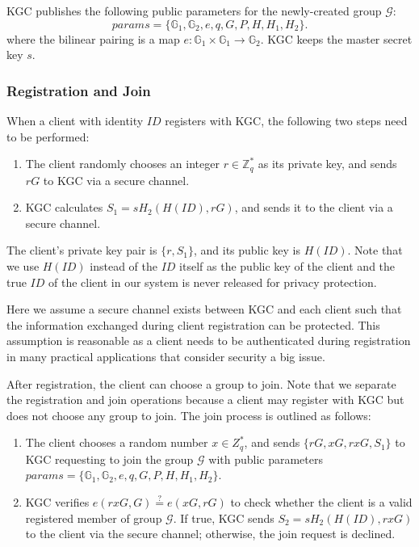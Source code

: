 \documentclass[letterpaper,12pt]{article}
\begin{document}
KGC publishes the following public parameters for the newly-created group $\mathcal{G}$:
\begin{equation}
params=\{\mathbb{G}_1, \mathbb{G}_2, e, q, G, P, H, H_1, H_2\}.
\end{equation}
where the bilinear pairing is a map $e: \mathbb{G}_1\times \mathbb{G}_1\longrightarrow \mathbb{G}_2$.
KGC keeps the master secret key $s$.

\subsubsection{Registration and Join}\label{sec:sec:Registration_Join}
When a client with identity $ID$ registers with KGC, the following two steps need to be performed:
\begin{enumerate}
 \item The client randomly chooses an integer $r \in \mathbb{Z}_q^{\ast}$ as its private key, and sends $rG$ to KGC via a secure channel.

 \item KGC calculates $S_1=sH_2(H(ID), rG)$, and sends it to the client via a secure channel.
\end{enumerate}
The client's private key pair is $\{r, S_1\}$, and its public key is $H(ID)$. Note that we use $H(ID)$ instead of the $ID$ itself as the public key of the client and the true $ID$ of the client in our system is never released for privacy protection.


Here we assume a secure channel exists between KGC and each client such that the information exchanged during client registration can be protected. This assumption is reasonable as a client needs to be authenticated during registration in many practical applications that consider security a big issue.

After registration, the client can choose a group to join. Note that we separate the registration and join operations because a client may register with KGC but does not choose any group to join.  The join process is outlined as follows:
\begin{enumerate}
 \item The client chooses a random number $x \in Z_q^{\ast}$, and sends $\{rG, xG, rxG, S_1\}$ to KGC requesting to join the group $\mathcal{G}$ with public parameters $params=\{\mathbb{G}_1, \mathbb{G}_2, e, q, G, P, H, H_1, H_2\}$.

 \item KGC verifies $e(rxG, G)\overset{?}{=}e(xG, rG)$ to check whether the client is a valid registered member of group $\mathcal{G}$. If true, KGC sends $S_2=sH_2(H(ID),rxG)$ to the client via the secure channel; otherwise, the join request is declined.
\end{enumerate}
\end{document}
